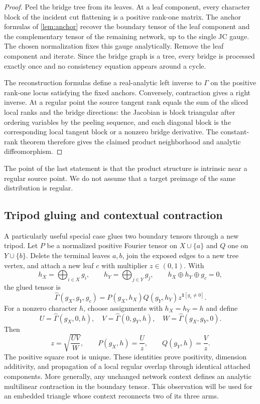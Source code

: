 \begin{proof}
Peel the bridge tree from its leaves.  At a leaf component, every character block of the incident cut flattening is a positive rank-one matrix.  The anchor formulas of \cref{lem:anchor} recover the boundary tensor of the leaf component and the complementary tensor of the remaining network, up to the single JC gauge.  The chosen normalization fixes this gauge analytically.  Remove the leaf component and iterate.  Since the bridge graph is a tree, every bridge is processed exactly once and no consistency equation appears around a cycle.

The reconstruction formulas define a real-analytic left inverse to $\Gamma$ on the positive rank-one locus satisfying the fixed anchors.  Conversely, contraction gives a right inverse.  At a regular point the source tangent rank equals the sum of the sliced local ranks and the bridge directions: the Jacobian is block triangular after ordering variables by the peeling sequence, and each diagonal block is the corresponding local tangent block or a nonzero bridge derivative.  The constant-rank theorem therefore gives the claimed product neighborhood and analytic diffeomorphism.
\end{proof}

The point of the last statement is that the product structure is intrinsic near a regular source point.  We do not assume that a target preimage of the same distribution is regular.

\subsection{Tripod gluing and contextual contraction}

A particularly useful special case glues two boundary tensors through a new tripod.  Let $P$ be a normalized positive Fourier tensor on $X\cup\{a\}$ and $Q$ one on $Y\cup\{b\}$.  Delete the terminal leaves $a,b$, join the exposed edges to a new tree vertex, and attach a new leaf $c$ with multiplier $z\in(0,1)$.  With
\[
h_X=\bigoplus_{i\in X}g_i,
\qquad
h_Y=\bigoplus_{j\in Y}g_j,
\qquad
h_X\oplus h_Y\oplus g_c=0,
\]
the glued tensor is
\begin{equation}\label{eq:tripod-glue}
\widehat\Gamma(g_X,g_Y,g_c)
=P(g_X,h_X)Q(g_Y,h_Y)z^{\mathbf1[g_c\ne0]}.
\end{equation}
For a nonzero character $h$, choose assignments with $h_X=h_Y=h$ and define
\[
U=\widehat\Gamma(g_X,0,h),\quad
V=\widehat\Gamma(0,g_Y,h),\quad
W=\widehat\Gamma(g_X,g_Y,0).
\]
Then
\begin{equation}\label{eq:tripod-inverse}
z=\sqrt{\frac{UV}{W}},
\qquad
P(g_X,h)=\frac Uz,
\qquad
Q(g_Y,h)=\frac Vz.
\end{equation}
The positive square root is unique.  These identities prove positivity, dimension additivity, and propagation of a local regular overlap through identical attached components.  More generally, any unchanged network context defines an analytic multilinear contraction in the boundary tensor.  This observation will be used for an embedded triangle whose context reconnects two of its three arms.
